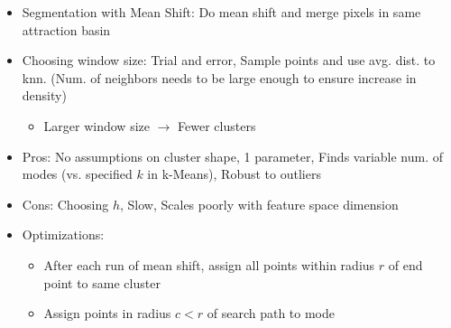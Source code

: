\documentclass{article}
\begin{document}
\begin{multicols*}{4}
\begin{itemize}
    \begin{itemize}
        \item Segmentation with Mean Shift: Do mean shift and merge pixels in same attraction basin
        \item Choosing window size: Trial and error, Sample points and use avg. dist. to knn. (Num. of neighbors needs to be large enough to ensure increase in density)
        \begin{itemize}
            \item Larger window size $\rightarrow$ Fewer clusters
        \end{itemize}
        \item Pros: No assumptions on cluster shape, 1 parameter, Finds variable num. of modes (vs. specified $k$ in k-Means), Robust to outliers
        \item Cons: Choosing $h$, Slow, Scales poorly with feature space dimension
        \item Optimizations:
        \begin{itemize}
            \item After each run of mean shift, assign all points within radius $r$ of end point to same cluster
            \item Assign points in radius $c < r$ of search path to mode
        \end{itemize}
    \end{itemize}
\end{itemize}

\end{multicols*}
\end{document}

